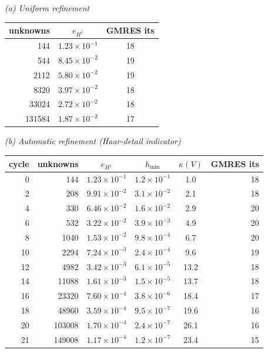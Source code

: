 \textit{(a) Uniform refinement}\\[2pt]
\begin{tabular}{rcc}
\toprule
unknowns & $e_{H^1}$ & GMRES its\\
\midrule
144 & $1.23{\times}10^{-1}$ & 18\\
544 & $8.45{\times}10^{-2}$ & 19\\
2112 & $5.80{\times}10^{-2}$ & 19\\
8320 & $3.97{\times}10^{-2}$ & 18\\
33024 & $2.72{\times}10^{-2}$ & 18\\
131584 & $1.87{\times}10^{-2}$ & 17\\
\bottomrule
\end{tabular}

\medskip
\textit{(b) Automatic refinement (Haar-detail indicator)}\\[2pt]
\begin{tabular}{rr ccc r}
\toprule
cycle & unknowns & $e_{H^1}$ & $h_{\min}$ & $\kappa(V)$ & GMRES its\\
\midrule
0 & 144 & $1.23{\times}10^{-1}$ & $1.2{\times}10^{-1}$ & 1.0 & 18\\
2 & 208 & $9.91{\times}10^{-2}$ & $3.1{\times}10^{-2}$ & 2.1 & 18\\
4 & 330 & $6.46{\times}10^{-2}$ & $1.6{\times}10^{-2}$ & 2.9 & 20\\
6 & 532 & $3.22{\times}10^{-2}$ & $3.9{\times}10^{-3}$ & 4.9 & 20\\
8 & 1040 & $1.53{\times}10^{-2}$ & $9.8{\times}10^{-4}$ & 6.7 & 20\\
10 & 2294 & $7.24{\times}10^{-3}$ & $2.4{\times}10^{-4}$ & 9.6 & 19\\
12 & 4982 & $3.42{\times}10^{-3}$ & $6.1{\times}10^{-5}$ & 13.2 & 18\\
14 & 11088 & $1.61{\times}10^{-3}$ & $1.5{\times}10^{-5}$ & 13.7 & 18\\
16 & 23320 & $7.60{\times}10^{-4}$ & $3.8{\times}10^{-6}$ & 18.4 & 17\\
18 & 48960 & $3.59{\times}10^{-4}$ & $9.5{\times}10^{-7}$ & 19.6 & 16\\
20 & 103008 & $1.70{\times}10^{-4}$ & $2.4{\times}10^{-7}$ & 26.1 & 16\\
21 & 149008 & $1.17{\times}10^{-4}$ & $1.2{\times}10^{-7}$ & 23.4 & 15\\
\bottomrule
\end{tabular}

